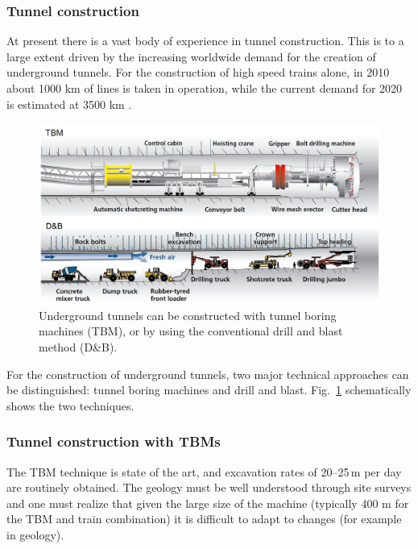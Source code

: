 \FloatBarrier
\subsubsection*{Tunnel construction}

At present there is a vast body of experience in tunnel construction.
This is to a large extent driven by the increasing worldwide demand 
for the creation of underground tunnels.
For the construction of high speed trains alone, in 2010
about 1000 km of lines is taken in operation, while the current demand
for 2020 is estimated at 3500 km \cite{itacet}.

\begin{figure}[htbp!]
\centering
\includegraphics[width=16cm]{./Sec_SiteInfra/Figures/tunneling.jpg}
\caption{Underground tunnels can be constructed with tunnel boring machines (TBM),
or by using the conventional drill and blast method (D\&B).}
\label{fig:tunneling}
\end{figure}

For the construction of underground tunnels, two major technical
approaches can be distinguished: tunnel boring machines and
drill and blast. Fig.~\ref{fig:tunneling} schematically shows
the two techniques.

\FloatBarrier
\subsubsection*{Tunnel construction with TBMs}

The TBM technique is state of the art, and excavation rates of 20--25\,m per day
are routinely obtained. The geology must be well understood through site
surveys and one must realize that given the large size of the machine
(typically 400 m for the TBM and train combination) it is difficult to adapt to
changes (for example in geology). 

